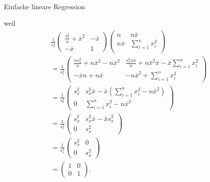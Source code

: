 \documentclass[
  8pt,
  ignorenonframetext,
]{beamer}
\begin{document}
\begin{frame}{Einfache lineare Regression}
\protect\hypertarget{einfache-lineare-regression-5}{}
\footnotesize

weil \begin{align}
\begin{split}
& \frac{1}{s_x^2}
\begin{pmatrix}
  \frac{s_x^2}{n} + \bar{x}^2
& -\bar{x}
\\
  -\bar{x}
&  1
\end{pmatrix}
\begin{pmatrix}
n           &  n\bar{x} \\
n\bar{x}    & \sum_{i=1}^n x_i^2\\
\end{pmatrix}
\\
& =
\frac{1}{s_x^2}
\begin{pmatrix}
\frac{ns_x^2}{n} + n\bar{x}^2 - n \bar{x}^2
& \frac{s_x^2n\bar{x}}{n} +n\bar{x}^2\bar{x} - \bar{x}\sum_{i=1}^n x_i^2
\\
-\bar{x}n + n \bar{x}
& - n\bar{x}^2 + \sum_{i=1}^n x_i^2
\end{pmatrix} \\
& =
\frac{1}{s_x^2}
\begin{pmatrix}
s_x^2
& s_x^2\bar{x} -\bar{x} \left(\sum_{i=1}^n x_i^2 - n\bar{x}^2\right)
\\
0
& \sum_{i=1}^n x_i^2 - n\bar{x}^2
\end{pmatrix}
\\
& =
\frac{1}{s_x^2}
\begin{pmatrix}
s_x^2
& s_x^2\bar{x} - \bar{x} s_x^2
\\
0
& s_x^2
\end{pmatrix}
\\
& =
\frac{1}{s_x^2}
\begin{pmatrix}
s_x^2
& 0
\\
0
& s_x^2
\end{pmatrix}
\\
& =
\begin{pmatrix}
1 & 0 \\ 0 & 1
\end{pmatrix}.
\end{split}
\end{align}
\end{frame}
\end{document}
